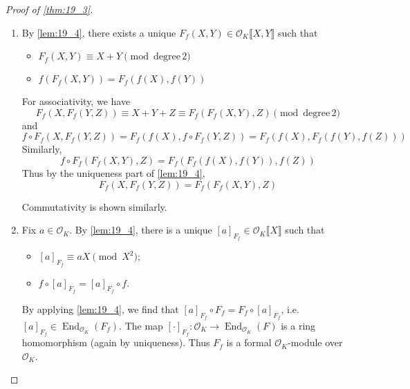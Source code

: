 \documentclass[11pt]{article}
\theoremstyle{definition}
\theoremstyle{plain}
\theoremstyle{remark}
\DeclareMathOperator{\End}{End}
\newcommand{\cO}{\mathcal{O}}
\begin{document}
\begin{proof}[Proof of \autoref{thm:19_3}]\phantom{}
    \begin{enumerate}
        \item By \autoref{lem:19_4}, there exists a unique $F_f(X, Y) \in \cO_K \llbracket X, Y \rrbracket$ such that
            \begin{itemize}
                \item $F_f(X, Y) \equiv X + Y \pmod{\textrm{degree}\,2}$
                \item $f(F_f(X, Y)) = F_f(f(X), f(Y))$
            \end{itemize}
            For associativity, we have
            \begin{equation*}
                F_f(X, F_f(Y, Z)) \equiv X + Y + Z \equiv F_f(F_f(X, Y), Z) \pmod{\textrm{degree}\,2}
            \end{equation*}
            and
            \begin{equation*}
                f \circ F_f(X, F_f(Y, Z)) = F_f(f(X), f \circ F_f(Y, Z)) = F_f(f(X), F_f(f(Y), f(Z)))
            \end{equation*}
            Similarly,
            \begin{equation*}
                f \circ F_f(F_f(X, Y), Z) = F_f(F_f(f(X), f(Y)), f(Z))
            \end{equation*}
            Thus by the uniqueness part of \autoref{lem:19_4},
            \begin{equation*}
                F_f(X, F_f(Y, Z)) = F_f(F_f(X, Y), Z)
            \end{equation*}

            Commutativity is shown similarly.

        \item Fix $a \in \cO_K$. By \autoref{lem:19_4}, there is a unique $[a]_{F_f} \in \cO_K \llbracket X \rrbracket$ such that
            \begin{itemize}
                \item $[a]_{F_f} \equiv a X \pmod{X^2}$;
                \item $f \circ [a]_{F_f} = [a]_{F_f} \circ f$.
            \end{itemize}

            By applying \autoref{lem:19_4}, we find that $[a]_{F_f} \circ F_f = F_f \circ [a]_{F_f}$, i.e. $[a]_{F_f} \in \End_{\cO_K}(F_f)$. The map $[\cdot]_{F_f} : \cO_K \to \End_{\cO_K}(F)$  is a ring homomorphism (again by uniqueness). Thus $F_f$ is a formal $\cO_K$-module over $\cO_K$.


\end{enumerate}
\end{proof}
\end{document}
